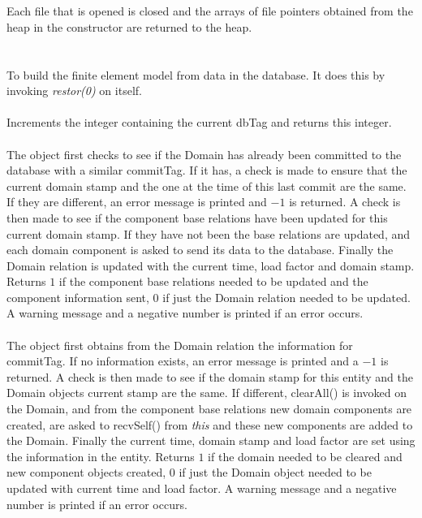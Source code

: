  \\
\\ 
Each file that is opened is closed and the arrays of file pointers
obtained from the heap in the constructor are returned to the heap. \\

  \\
\\ 
To build the finite element model from data in the database. It does
this by invoking {\em restor(0)} on itself. \\

\\
Increments the integer containing the current dbTag and returns this
integer. \\

\\
The object first checks to see if the Domain has already been
committed to the database with a similar \p commitTag. If it has, a
check is made to ensure that the current domain stamp and the one at
the time of this last commit are the same. If they are different, an
error message is printed and $-1$ is returned. A check is then made to
see if the component base relations have been updated for this current domain
stamp. If they have not been the base relations are updated, and each
domain component is asked to send its data to the database. Finally
the Domain relation is updated with the current time, load factor and
domain stamp. Returns $1$ if the component base relations needed to be updated
and the component information sent, $0$ if just the Domain relation
needed to be updated. A warning message and a negative number is
printed if an error occurs. \\


\\ 
The object first obtains from the Domain relation the information for
\p commitTag. If no information exists, an error message is printed
and a $-1$ is returned. A check is then made to see if the domain
stamp for this entity and the Domain objects current stamp are the
same. If different, clearAll() is invoked on the Domain, and
from the component base relations new domain components are created,
are asked to recvSelf() from {\em *this} and these new
components are added to the Domain. Finally the current time, domain
stamp and load factor are set using the information in the entity. 
Returns $1$ if the domain needed to be cleared and new component
objects created, $0$ if just the Domain object needed to be updated
with current time and load factor. A warning message and a negative
number is printed if an error occurs. \\

